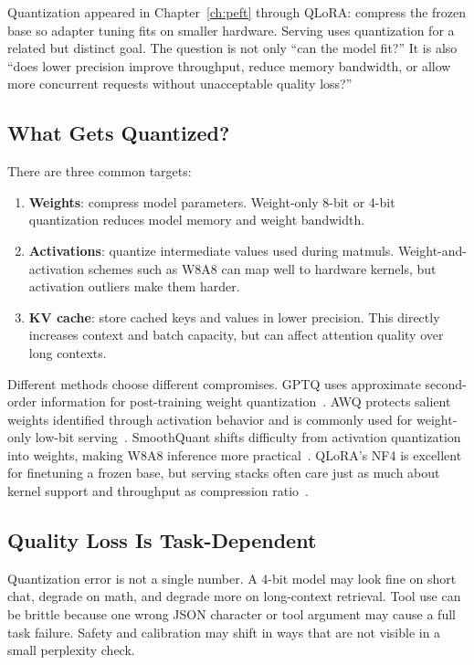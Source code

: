 Quantization appeared in Chapter~\ref{ch:peft} through QLoRA: compress the frozen base so adapter tuning fits on smaller hardware. Serving uses quantization for a related but distinct goal. The question is not only ``can the model fit?'' It is also ``does lower precision improve throughput, reduce memory bandwidth, or allow more concurrent requests without unacceptable quality loss?''

\subsection{What Gets Quantized?}

There are three common targets:

\begin{enumerate}[nosep]
  \item \textbf{Weights}: compress model parameters. Weight-only 8-bit or 4-bit quantization reduces model memory and weight bandwidth.
  \item \textbf{Activations}: quantize intermediate values used during matmuls. Weight-and-activation schemes such as W8A8 can map well to hardware kernels, but activation outliers make them harder.
  \item \textbf{KV cache}: store cached keys and values in lower precision. This directly increases context and batch capacity, but can affect attention quality over long contexts.
\end{enumerate}

Different methods choose different compromises. GPTQ uses approximate second-order information for post-training weight quantization~\cite{frantar2022gptq}. AWQ protects salient weights identified through activation behavior and is commonly used for weight-only low-bit serving~\cite{lin2024awq}. SmoothQuant shifts difficulty from activation quantization into weights, making W8A8 inference more practical~\cite{xiao2023smoothquant}. QLoRA's NF4 is excellent for finetuning a frozen base, but serving stacks often care just as much about kernel support and throughput as compression ratio~\cite{dettmers2023qlora}.

\subsection{Quality Loss Is Task-Dependent}

Quantization error is not a single number. A 4-bit model may look fine on short chat, degrade on math, and degrade more on long-context retrieval. Tool use can be brittle because one wrong JSON character or tool argument may cause a full task failure. Safety and calibration may shift in ways that are not visible in a small perplexity check.

